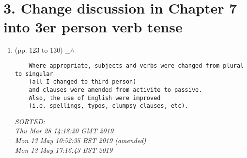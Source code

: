 \documentclass[12pt]{article}
\begin{document}
\section*{3. 
	Change discussion in Chapter 7 into 3er person verb tense
	}

\begin{enumerate}

\item  (pp. 123 to 130)  \_$\wedge$  

	\begin{verbatim}
	Where appropriate, subjects and verbs were changed from plural to singular
	(all I changed to third person)
	and clauses were amended from activite to passive.
	Also, the use of English were improved
	(i.e. spellings, typos, clumpsy clauses, etc). 
	\end{verbatim}
	\textit{
	SORTED: \\
	Thu Mar 28 14:18:20 GMT 2019 \\
	Mon 13 May 10:52:35 BST 2019 (amended) \\
	Mon 13 May 17:16:43 BST 2019
	}
	\\


%
%
%



\end{enumerate}


\end{document}
